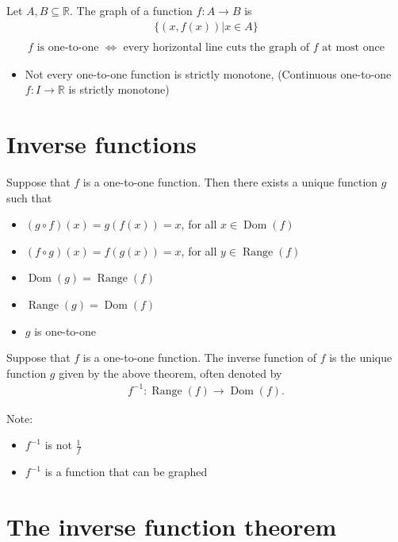 \documentclass{report}
\begin{document}
			Let $A,B \subseteq \mathbb{R}$. The graph of a function $f:A \to B$ is
			\begin{align*}
				\big\{ (x, f(x)) | x \in A \big\}	\\
			\end{align*}
			\begin{align*}
				f \text{ is one-to-one } \Longleftrightarrow \text{ every horizontal line cuts the graph of $f$ at most once}
			\end{align*}

			\begin{itemize}
				\item Not every one-to-one function is strictly monotone, (Continuous one-to-one $f:I\to\mathbb{R}$ is strictly monotone)
			\end{itemize}

	\section{Inverse functions}

		Suppose that $f$ is a one-to-one function. Then there exists a unique function $g$ such that
			\begin{itemize}
				\item $(g \circ f)(x) = g(f(x)) = x$, for all $x \in \operatorname{Dom}(f)$
				\item $(f \circ g)(x) = f(g(x)) = x$, for all $y \in \operatorname{Range}(f)$
				\item $\operatorname{Dom}(g) = \operatorname{Range}(f)$
				\item $\operatorname{Range}(g) = \operatorname{Dom}(f)$
				\item $g$ is one-to-one
			\end{itemize}

		Suppose that $f$ is a one-to-one function. The inverse function of $f$ is the unique function $g$ given by the above theorem, often denoted by
			\begin{align*}
				f^{-1}: \operatorname{Range}(f) \rightarrow \operatorname{Dom}(f).
			\end{align*}

		Note:
			\begin{itemize}
				\item $f^{-1}$ is not $\frac{1}{f}$
				\item $f^{-1}$ is a function that can be graphed
			\end{itemize}

	\section{The inverse function theorem}
\end{document}
